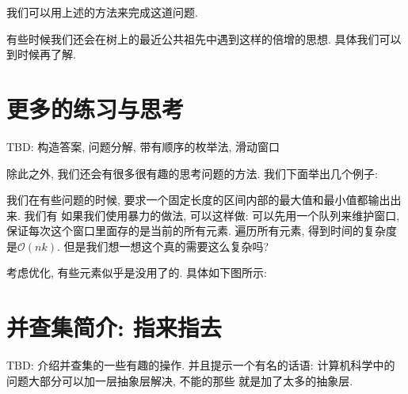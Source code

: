  我们可以用上述的方法来完成这道问题. 

有些时候我们还会在树上的最近公共祖先中遇到这样的倍增的思想. 具体我们可以到时候再了解. 

\section{更多的练习与思考}

TBD: 构造答案, 问题分解, 带有顺序的枚举法, 滑动窗口

除此之外, 我们还会有很多很有趣的思考问题的方法. 我们下面举出几个例子: 

 我们在有些问题的时候, 要求一个固定长度的区间内部的最大值和最小值都输出出来. 我们有
如果我们使用暴力的做法, 可以这样做: 可以先用一个队列来维护窗口, 保证每次这个窗口里面存的是当前的所有元素. 
遍历所有元素, 得到时间的复杂度是$\mathcal O(nk)$. 但是我们想一想这个真的需要这么复杂吗? 

考虑优化, 有些元素似乎是没用了的. 具体如下图所示: 


\section{并查集简介: 指来指去}

TBD: 介绍并查集的一些有趣的操作. 并且提示一个有名的话语: 
计算机科学中的问题大部分可以加一层抽象层解决, 不能的那些
就是加了太多的抽象层. 